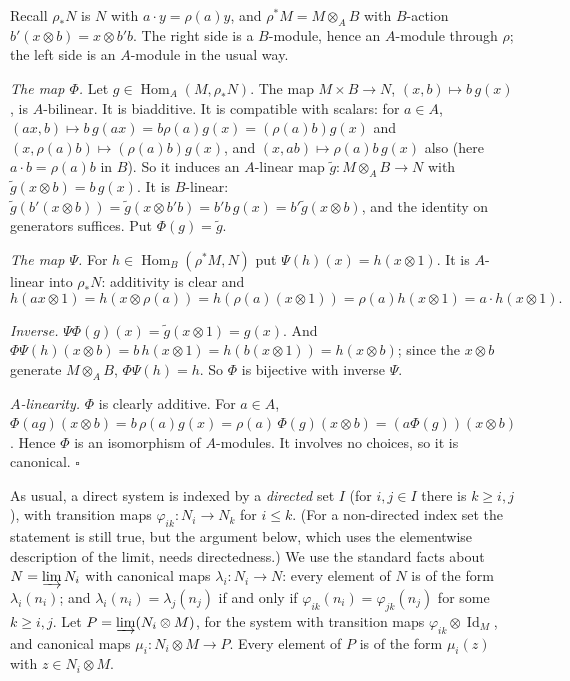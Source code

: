 \documentclass[11pt]{article}
\begin{document}
\pf
Recall $\rho_*N$ is $N$ with $a\cdot y=\rho(a)y$, and $\rho^*M=M\otimes_AB$ with $B$-action $b'(x\otimes b)=x\otimes b'b$. The right side is a $B$-module, hence an $A$-module through $\rho$; the left side is an $A$-module in the usual way.

\emph{The map $\Phi$.} Let $g\in\operatorname{Hom}_A(M,\rho_*N)$. The map $M\times B\to N$, $(x,b)\mapsto b\,g(x)$, is $A$-bilinear. It is biadditive. It is compatible with scalars: for $a\in A$, $(ax,b)\mapsto b\,g(ax)=b\rho(a)g(x)=(\rho(a)b)g(x)$ and $(x,\rho(a)b)\mapsto(\rho(a)b)g(x)$, and $(x,ab)\mapsto\rho(a)b\,g(x)$ also (here $a\cdot b=\rho(a)b$ in $B$). So it induces an $A$-linear map $\tilde g:M\otimes_AB\to N$ with $\tilde g(x\otimes b)=b\,g(x)$. It is $B$-linear: $\tilde g(b'(x\otimes b))=\tilde g(x\otimes b'b)=b'b\,g(x)=b'\tilde g(x\otimes b)$, and the identity on generators suffices. Put $\Phi(g)=\tilde g$.

\emph{The map $\Psi$.} For $h\in\operatorname{Hom}_B(\rho^*M,N)$ put $\Psi(h)(x)=h(x\otimes1)$. It is $A$-linear into $\rho_*N$: additivity is clear and
\[ h(ax\otimes1)=h(x\otimes\rho(a))=h(\rho(a)(x\otimes1))=\rho(a)h(x\otimes1)=a\cdot h(x\otimes 1). \]

\emph{Inverse.} $\Psi\Phi(g)(x)=\tilde g(x\otimes1)=g(x)$. And $\Phi\Psi(h)(x\otimes b)=b\,h(x\otimes1)=h(b(x\otimes1))=h(x\otimes b)$; since the $x\otimes b$ generate $M\otimes_AB$, $\Phi\Psi(h)=h$. So $\Phi$ is bijective with inverse $\Psi$.

\emph{$A$-linearity.} $\Phi$ is clearly additive. For $a\in A$, $\Phi(ag)(x\otimes b)=b\,\rho(a)g(x)=\rho(a)\,\Phi(g)(x\otimes b)=(a\Phi(g))(x\otimes b)$. Hence $\Phi$ is an isomorphism of $A$-modules. It involves no choices, so it is canonical. \hfill$\square$

\pf
As usual, a direct system is indexed by a \emph{directed} set $I$ (for $i,j\in I$ there is $k\ge i,j$), with transition maps $\varphi_{ik}:N_i\to N_k$ for $i\le k$. (For a non-directed index set the statement is still true, but the argument below, which uses the elementwise description of the limit, needs directedness.) We use the standard facts about $N=\varinjlim N_i$ with canonical maps $\lambda_i:N_i\to N$: every element of $N$ is of the form $\lambda_i(n_i)$; and $\lambda_i(n_i)=\lambda_j(n_j)$ if and only if $\varphi_{ik}(n_i)=\varphi_{jk}(n_j)$ for some $k\ge i,j$. Let $P=\varinjlim(N_i\otimes M)$, for the system with transition maps $\varphi_{ik}\otimes\operatorname{Id}_M$, and canonical maps $\mu_i:N_i\otimes M\to P$. Every element of $P$ is of the form $\mu_i(z)$ with $z\in N_i\otimes M$.
\end{document}
